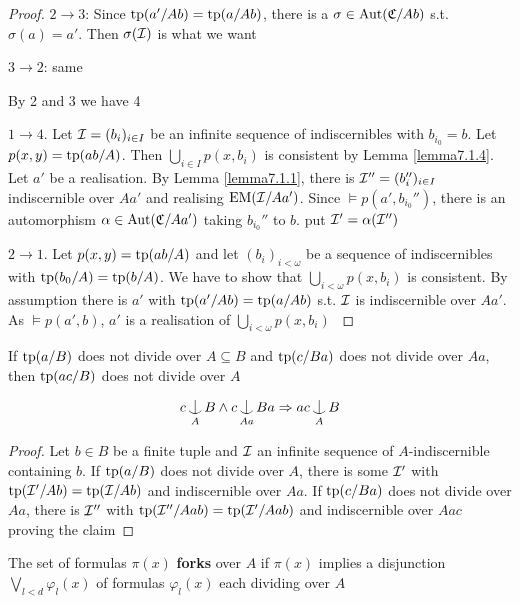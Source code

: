 \documentclass[11pt]{article}
\begin{document}
\begin{proof}
\(2\to 3\): Since \(\operatorname{tp}(a'/Ab)=\operatorname{tp}(a/Ab)\), there is a \(\sigma\in\operatorname{\text{Aut}}(\mathfrak{C}/Ab)\) s.t. \(\sigma(a)=a'\).
Then \(\sigma(\mathcal{I})\) is what we want

\(3\to 2\): same

By 2 and 3 we have 4

\(1\to 4\). Let \(\mathcal{I}=(b_i)_{i\in I}\) be an infinite sequence of indiscernibles with \(b_{i_0}=b\).
Let \(p(x,y)=\operatorname{tp}(ab/A)\). Then \(\bigcup_{i\in I}p(x,b_i)\) is consistent by Lemma \ref{lemma7.1.4}.
Let \(a'\) be a realisation. By Lemma \ref{lemma7.1.1}, there is \(\mathcal{I}''=(b_i'')_{i\in I}\)
indiscernible over \(Aa'\) and realising \(\operatorname{EM}(\mathcal{I}/Aa')\). Since \(\vDash p(a',b_{i_0}'')\), there is
an automorphism \(\alpha\in\operatorname{\text{Aut}}(\mathfrak{C}/Aa')\) taking \(b_{i_0}''\) to \(b\). put \(\mathcal{I}'=\alpha(\mathcal{I}'')\)

\(2\to 1\). Let \(p(x,y)=\operatorname{tp}(ab/A)\) and let \((b_i)_{i<\omega}\) be a sequence of indiscernibles
 with \(\operatorname{tp}(b_0/A)=\operatorname{tp}(b/A)\). We have to show that \(\bigcup_{i<\omega}p(x,b_i)\) is consistent.
By assumption there is \(a'\) with \(\operatorname{tp}(a'/Ab)=\operatorname{tp}(a/Ab)\) s.t. \(\mathcal{I}\) is indiscernible
over \(Aa'\).
As \(\vDash p(a',b)\), \(a'\) is a realisation of \(\bigcup_{i<\omega}p(x,b_i)\) \label{Problem13}
\end{proof}

\begin{proposition}[]
\label{prop7.1.6}
If \(\operatorname{tp}(a/B)\) does not divide over \(A\subseteq B\) and \(\operatorname{tp}(c/Ba)\) does not divide over \(Aa\),
then \(\operatorname{tp}(ac/B)\) does not divide over \(A\)
\end{proposition}

\begin{equation*}
c\ind_AB\wedge c\ind_{Aa}Ba\Rightarrow ac\ind_AB
\end{equation*}

\begin{proof}
Let \(b\in B\) be a finite tuple and \(\mathcal{I}\) an infinite sequence of \(A\)-indiscernible
containing \(b\). If \(\operatorname{tp}(a/B)\) does not divide over \(A\), there is some \(\mathcal{I}'\)
with \(\operatorname{tp}(\mathcal{I}'/Ab)=\operatorname{tp}(\mathcal{I}/Ab)\) and indiscernible over \(Aa\). If \(\operatorname{tp}(c/Ba)\) does not divide
over \(Aa\), there is \(\mathcal{I}''\) with \(\operatorname{tp}(\mathcal{I}''/Aab)=\operatorname{tp}(\mathcal{I}'/Aab)\) and indiscernible over \(Aac\)
proving the claim
\end{proof}

\begin{definition}[]
The set of formulas \(\pi(x)\) \textbf{forks} over \(A\) if \(\pi(x)\) implies a
disjunction \(\bigvee_{l<d}\varphi_l(x)\) of formulas \(\varphi_l(x)\) each dividing over \(A\)
\end{definition}
\end{document}
